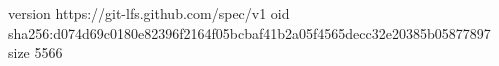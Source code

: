version https://git-lfs.github.com/spec/v1
oid sha256:d074d69c0180e82396f2164f05bcbaf41b2a05f4565decc32e20385b05877897
size 5566
